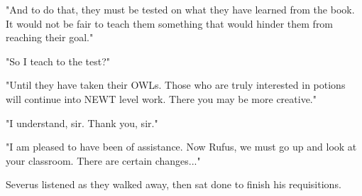 \documentclass[a4paper,11pt]{article}
\begin{document}
"And to do that, they must be tested on what they have learned from the book. It would not be fair to teach them something that would hinder them from reaching their goal."

"So I teach to the test?"

"Until they have taken their OWLs. Those who are truly interested in potions will continue into NEWT level work. There you may be more creative."

"I understand, sir. Thank you, sir."

"I am pleased to have been of assistance. Now Rufus, we must go up and look at your classroom. There are certain changes..."

Severus listened as they walked away, then sat done to finish his requisitions.
\end{document}
